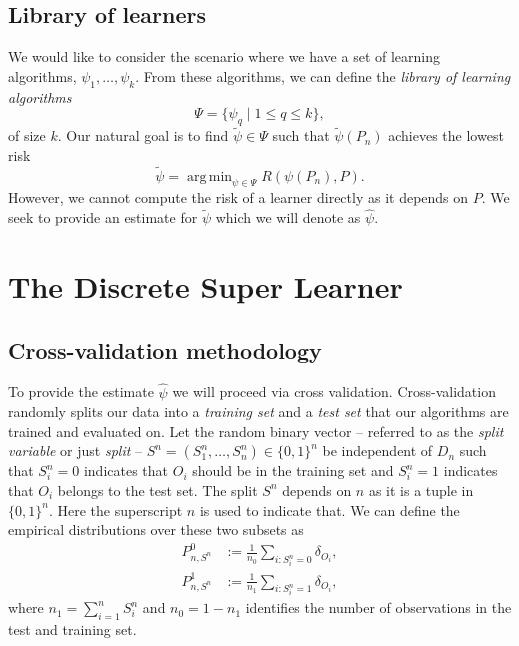 \documentclass[11pt, a4paper]{article}
\theoremstyle{definition}
\theoremstyle{remark}
\DeclareMathOperator*{\argmin}{arg\,min}
\newcommand{\q}{q}
\newcommand{\ml}{k}
\newcommand{\btheta}{\theta}
\newcommand{\la}{\psi}
\newcommand{\Sn}{S^n}
\newcommand{\lib}{\Psi}
\begin{document}


\subsection{Library of learners}
We would like to consider the scenario where we have a set of learning algorithms, $ \la_1, \ldots, \la_\ml $. From these algorithms, we can define the \textit{library of learning algorithms} 
$$ \lib = \{\la_{\q} \mid 1 \leq \q \leq \ml \}, $$
of size $ \ml $. Our natural goal is to find $ \tilde{\la} \in \lib $ such that $ \tilde{\la}(P_n) $ achieves the lowest risk 
$$ \tilde{\la}  = \argmin_{\la \in \lib} R(\la(P_n) , P). $$
However, we cannot compute the risk of a learner directly as it depends on $ P $. We seek to provide an estimate for $ \tilde{\la} $ which we will denote as $ \hat{\la} $. 

\section{The Discrete Super Learner}
\subsection{Cross-validation methodology}
To provide the estimate $ \hat{\la} $ we will proceed via cross validation. Cross-validation randomly splits our data into a \textit{training set} and a \textit{test set} that our algorithms are trained and evaluated on. Let the random binary vector -- referred to as the \textit{split variable} or just \textit{split} -- $ \Sn = (\Sn_1,\ldots,\Sn_n) \in \{0,1\}^{n} $ be independent of $ D_n $ such that $ \Sn_i = 0 $ indicates that $ O_i $ should be in the training set and $ \Sn_i = 1 $ indicates that $ O_i $ belongs to the test set. The split $ \Sn $ depends on $ n $ as it is a tuple in $ \{0,1\}^{n} $. Here the superscript $ n $ is used to indicate that. We can define the empirical distributions over these two subsets as
\begin{align*}
    P_{n,\Sn}^{0} &:= \frac{1}{n_0} \sum_{i: \Sn_i = 0} \delta_{O_i}, \\
    P_{n,\Sn}^{1} &:= \frac{1}{n_1} \sum_{i: \Sn_i = 1} \delta_{O_i},
\end{align*}
where $ n_1 = \sum_{i = 1}^{n} \Sn_i$ and $n_0 = 1-n_1$ identifies the number of observations in the test and training set.
\end{document}

